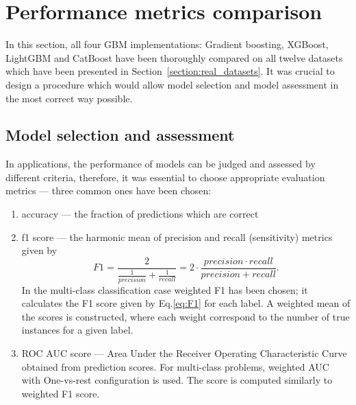 \documentclass[magisterska, english]{pwr_wmat_praca_dyplomowa}
\theoremstyle{plain}
\numberwithin{theorem}{chapter}
\theoremstyle{definition}
\numberwithin{theorem}{chapter}
\begin{document}
\section{Performance metrics comparison}
In this section, all four GBM implementations: Gradient boosting, XGBoost, LightGBM and CatBoost have been thoroughly compared on all twelve datasets which have been presented in Section~\ref{section:real_datasets}. It was crucial to design a procedure which would allow model selection and model assessment in the most correct way possible.

\subsection{Model selection and assessment}
In applications, the performance of models can be judged and assessed by different criteria, therefore, it was essential to choose appropriate evaluation metrics --- three common ones have been chosen:

\begin{enumerate} %
    \item accuracy --- the fraction of predictions which are correct
    \item f1 score --- the harmonic mean of precision and recall (sensitivity) metrics given by
    \begin{equation}\label{eq:F1}
        F1 = \frac{2}{\frac{1}{precision} + \frac{1}{recall}} = 2\cdot \frac{precision\cdot recall}{precision + recall}.
    \end{equation}
    In the multi-class classification case weighted F1 has been chosen; it calculates the F1 score given by Eq.\eqref{eq:F1} for each label. A weighted mean of the scores is constructed, where each weight correspond to the number of true instances for a given label.
    \item ROC AUC score --- Area Under the Receiver Operating Characteristic Curve obtained from prediction scores. For multi-class problems, weighted AUC with One-vs-rest configuration is used. The score is computed similarly to weighted F1 score.
\end{enumerate}
\end{document}

